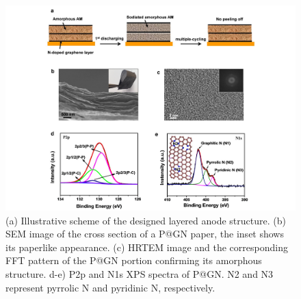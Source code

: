 \begin{figure}  
\includegraphics[width=320pt, angle=-90]{figures/figure4_1}
\caption[Layered structure design]
{(a) Illustrative scheme of the designed layered anode structure. (b) SEM image of the cross section of a P@GN paper, the inset shows its paperlike appearance. (c) HRTEM image and the corresponding FFT pattern of the P@GN portion confirming its amorphous structure. d-e) P2p and N1s XPS spectra of P@GN. N2 and N3 represent pyrrolic N and pyridinic N, respectively. 
\label{fig:4_1}}
\end{figure}

